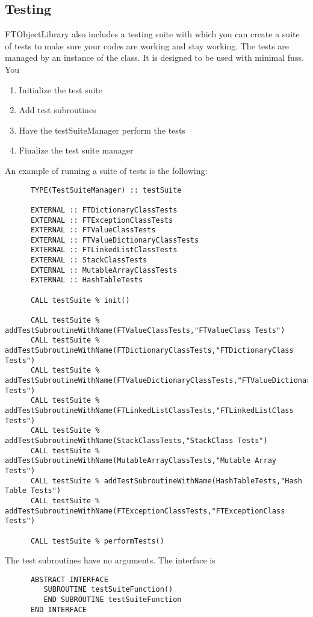 \documentclass[9pt]{article}
\begin{document}
\subsection{Testing}
FTObjectLibrary also includes a testing suite with which you can create a suite of tests
to make sure your codes are working and stay working. The tests are managed by an instance of the
{\color{blue}{TestSuiteManager}} class. It is designed to be used with minimal fuss. You
\begin{enumerate}
\item Initialize the test suite
\item Add test subroutines
\item Have the testSuiteManager perform the tests
\item Finalize the test suite manager
\end{enumerate}


An example of running a suite of tests is the following:
	{\color{blue}\begin{verbatim}
      TYPE(TestSuiteManager) :: testSuite
      
      EXTERNAL :: FTDictionaryClassTests
      EXTERNAL :: FTExceptionClassTests
      EXTERNAL :: FTValueClassTests
      EXTERNAL :: FTValueDictionaryClassTests
      EXTERNAL :: FTLinkedListClassTests
      EXTERNAL :: StackClassTests
      EXTERNAL :: MutableArrayClassTests
      EXTERNAL :: HashTableTests

      CALL testSuite % init()
      
      CALL testSuite % addTestSubroutineWithName(FTValueClassTests,"FTValueClass Tests")
      CALL testSuite % addTestSubroutineWithName(FTDictionaryClassTests,"FTDictionaryClass Tests")
      CALL testSuite % addTestSubroutineWithName(FTValueDictionaryClassTests,"FTValueDictionaryClass Tests")
      CALL testSuite % addTestSubroutineWithName(FTLinkedListClassTests,"FTLinkedListClass Tests")
      CALL testSuite % addTestSubroutineWithName(StackClassTests,"StackClass Tests")
      CALL testSuite % addTestSubroutineWithName(MutableArrayClassTests,"Mutable Array Tests")
      CALL testSuite % addTestSubroutineWithName(HashTableTests,"Hash Table Tests")
      CALL testSuite % addTestSubroutineWithName(FTExceptionClassTests,"FTExceptionClass Tests")

      CALL testSuite % performTests()

	\end{verbatim}}
The test subroutines have no arguments. The interface is
{\color{blue}\begin{verbatim}
      ABSTRACT INTERFACE
         SUBROUTINE testSuiteFunction()
         END SUBROUTINE testSuiteFunction
      END INTERFACE
\end{verbatim}}
\end{document}
